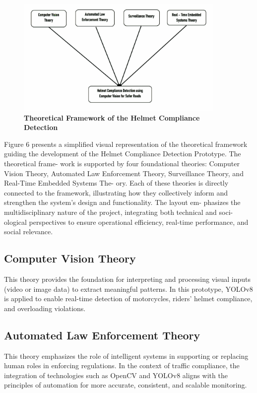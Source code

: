 \begin{refsection}
\begin{figure}[H]
    \centering
    \includegraphics[width=0.9\textwidth]{figures/Fig 6.jpg}
    \caption{\textbf{Theoretical Framework of the Helmet Compliance Detection }}
    \label{figures/Fig 6.jpg}
\end{figure}
Figure 6 presents a simplified visual representation of the theoretical framework guiding the development of the Helmet Compliance Detection Prototype. The theoretical frame- work is supported by four foundational theories: Computer Vision Theory, Automated Law Enforcement Theory, Surveillance Theory, and Real-Time Embedded Systems The- ory. Each of these theories is directly connected to the framework, illustrating how they collectively inform and strengthen the system’s design and functionality. The layout em- phasizes the multidisciplinary nature of the project, integrating both technical and soci- ological perspectives to ensure operational efficiency, real-time performance, and social relevance.


\subsection{Computer Vision Theory}
This theory provides the foundation for interpreting and processing visual inputs (video or image data) to extract meaningful patterns. In this prototype, YOLOv8 is applied to enable real-time detection of motorcycles, riders’ helmet compliance, and overloading violations.

\subsection{Automated Law Enforcement Theory}
This theory emphasizes the role of intelligent systems in supporting or replacing human roles in enforcing regulations. In the context of traffic compliance, the integration of technologies such as OpenCV and YOLOv8 aligns with the principles of automation for more accurate, consistent, and scalable monitoring.


\end{refsection}
